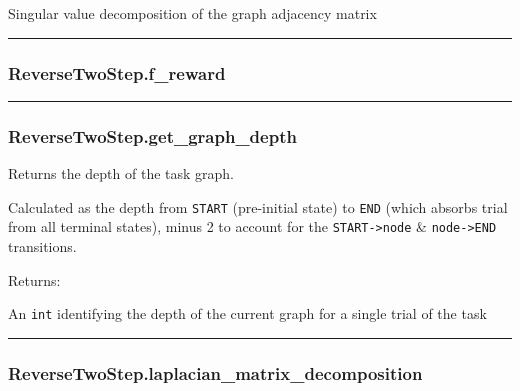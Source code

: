 Singular value decomposition of the graph adjacency matrix

\begin{center}\rule{0.5\linewidth}{\linethickness}\end{center}

\subsubsection{ReverseTwoStep.f\_reward}\label{reversetwostep.f_reward}

\begin{Shaded}
\begin{Highlighting}[]
\end{Highlighting}
\end{Shaded}

\begin{center}\rule{0.5\linewidth}{\linethickness}\end{center}

\subsubsection{ReverseTwoStep.get\_graph\_depth}\label{reversetwostep.get_graph_depth}

\begin{Shaded}
\begin{Highlighting}[]
\NormalTok{)}
\end{Highlighting}
\end{Shaded}

Returns the depth of the task graph.

Calculated as the depth from \texttt{START} (pre-initial state) to
\texttt{END} (which absorbs trial from all terminal states), minus 2 to
account for the \texttt{START-\textgreater{}node} \&
\texttt{node-\textgreater{}END} transitions.

Returns:

An \texttt{int} identifying the depth of the current graph for a single
trial of the task

\begin{center}\rule{0.5\linewidth}{\linethickness}\end{center}

\subsubsection{ReverseTwoStep.laplacian\_matrix\_decomposition}\label{reversetwostep.laplacian_matrix_decomposition}

